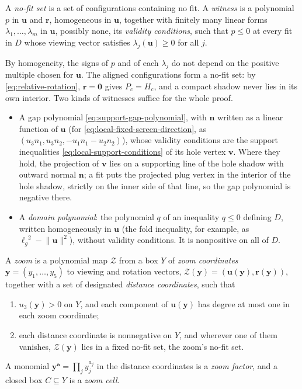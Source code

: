 \begin{definition}\label{def:witness}
  A \emph{no-fit set} is a set of configurations containing no fit.
  A \emph{witness} is a polynomial $p$ in $\mathbf u$ and $\mathbf r$,
  homogeneous in $\mathbf u$, together with finitely many linear forms
  $\lambda_1,\dots,\lambda_m$ in $\mathbf u$, possibly none, its
  \emph{validity conditions}, such that $p\le0$ at every fit in $D$
  whose viewing vector satisfies $\lambda_j(\mathbf u)\ge0$ for all $j$.
\end{definition}

By homogeneity, the signs of $p$ and of each $\lambda_j$ do not depend on
the positive multiple chosen for $\mathbf u$. The aligned configurations form
a no-fit set: by \cref{eq:relative-rotation}, $\mathbf r=\mathbf0$ gives
$P_c=H_c$, and a compact shadow never lies in its own interior. Two kinds
of witnesses suffice for the whole proof.
\begin{itemize}
  \item A gap polynomial \cref{eq:support-gap-polynomial}, with
    $\mathbf n$ written as a linear function of $\mathbf u$ (for
    \cref{eq:local-fixed-screen-direction}, as
    $(u_3n_1,u_3n_2,-u_1n_1-u_2n_2)$), whose validity conditions are the
    support inequalities \cref{eq:local-support-conditions} of its hole
    vertex $\mathbf v$. Where they hold, the projection of $\mathbf v$ lies on
    a supporting line of the hole shadow with outward normal $\mathbf n$; a fit
    puts the projected plug vertex in the interior of the hole shadow, strictly
    on the inner side of that line, so the gap polynomial is negative there.
  \item A \emph{domain polynomial}: the polynomial $q$ of an inequality
    $q\le0$ defining $D$, written homogeneously in $\mathbf u$ (the fold
    inequality, for example, as ${\ell_g}^2-\lVert\mathbf u\rVert^2$), without
    validity conditions. It is nonpositive on all of $D$.
\end{itemize}

\begin{definition}[Zooms]\label{def:zoom}
  A \emph{zoom} is a polynomial map $\mathcal Z$ from a box $Y$ of
  \emph{zoom coordinates} $\mathbf y=(y_1,\dots,y_5)$ to viewing and
  rotation vectors, $\mathcal Z(\mathbf y)=(\mathbf u(\mathbf y),\mathbf r(\mathbf y))$,
  together with a set of designated \emph{distance coordinates}, such that
  \begin{enumerate}
    \item $u_3(\mathbf y)>0$ on $Y$, and each component of
      $\mathbf u(\mathbf y)$ has degree at most one in each zoom coordinate;
    \item each distance coordinate is nonnegative on $Y$, and wherever one
      of them vanishes, $\mathcal Z(\mathbf y)$ lies in a fixed no-fit set,
      the zoom's no-fit set.
  \end{enumerate}
  A monomial $\mathbf y^{\mathbf a}=\prod_jy_j^{a_j}$ in the distance
  coordinates is a \emph{zoom factor}, and a closed box $C\subseteq Y$ is a
  \emph{zoom cell}.
\end{definition}


